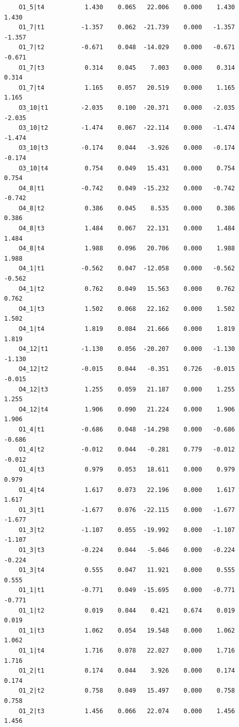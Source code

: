 \documentclass[
  letterpaper,
  DIV=11,
  numbers=noendperiod]{scrartcl}
\begin{document}
\begin{verbatim}
    O1_5|t4           1.430    0.065   22.006    0.000    1.430    1.430
    O1_7|t1          -1.357    0.062  -21.739    0.000   -1.357   -1.357
    O1_7|t2          -0.671    0.048  -14.029    0.000   -0.671   -0.671
    O1_7|t3           0.314    0.045    7.003    0.000    0.314    0.314
    O1_7|t4           1.165    0.057   20.519    0.000    1.165    1.165
    O3_10|t1         -2.035    0.100  -20.371    0.000   -2.035   -2.035
    O3_10|t2         -1.474    0.067  -22.114    0.000   -1.474   -1.474
    O3_10|t3         -0.174    0.044   -3.926    0.000   -0.174   -0.174
    O3_10|t4          0.754    0.049   15.431    0.000    0.754    0.754
    O4_8|t1          -0.742    0.049  -15.232    0.000   -0.742   -0.742
    O4_8|t2           0.386    0.045    8.535    0.000    0.386    0.386
    O4_8|t3           1.484    0.067   22.131    0.000    1.484    1.484
    O4_8|t4           1.988    0.096   20.706    0.000    1.988    1.988
    O4_1|t1          -0.562    0.047  -12.058    0.000   -0.562   -0.562
    O4_1|t2           0.762    0.049   15.563    0.000    0.762    0.762
    O4_1|t3           1.502    0.068   22.162    0.000    1.502    1.502
    O4_1|t4           1.819    0.084   21.666    0.000    1.819    1.819
    O4_12|t1         -1.130    0.056  -20.207    0.000   -1.130   -1.130
    O4_12|t2         -0.015    0.044   -0.351    0.726   -0.015   -0.015
    O4_12|t3          1.255    0.059   21.187    0.000    1.255    1.255
    O4_12|t4          1.906    0.090   21.224    0.000    1.906    1.906
    O1_4|t1          -0.686    0.048  -14.298    0.000   -0.686   -0.686
    O1_4|t2          -0.012    0.044   -0.281    0.779   -0.012   -0.012
    O1_4|t3           0.979    0.053   18.611    0.000    0.979    0.979
    O1_4|t4           1.617    0.073   22.196    0.000    1.617    1.617
    O1_3|t1          -1.677    0.076  -22.115    0.000   -1.677   -1.677
    O1_3|t2          -1.107    0.055  -19.992    0.000   -1.107   -1.107
    O1_3|t3          -0.224    0.044   -5.046    0.000   -0.224   -0.224
    O1_3|t4           0.555    0.047   11.921    0.000    0.555    0.555
    O1_1|t1          -0.771    0.049  -15.695    0.000   -0.771   -0.771
    O1_1|t2           0.019    0.044    0.421    0.674    0.019    0.019
    O1_1|t3           1.062    0.054   19.548    0.000    1.062    1.062
    O1_1|t4           1.716    0.078   22.027    0.000    1.716    1.716
    O1_2|t1           0.174    0.044    3.926    0.000    0.174    0.174
    O1_2|t2           0.758    0.049   15.497    0.000    0.758    0.758
    O1_2|t3           1.456    0.066   22.074    0.000    1.456    1.456

\end{verbatim}
\end{document}
